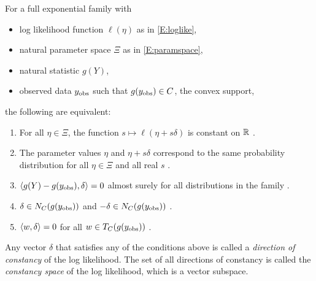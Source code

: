 \begin{theorem} \label{Thm:DOC}
For a full exponential family with
\begin{itemize}
\item log likelihood function $\ell(\eta)$ as in \eqref{E:loglike},
\item natural parameter space $\Xi$ as in \eqref{E:paramspace},
\item natural statistic $g(Y)$,
\item observed data $y_{\textrm{obs}}$ such that $g(y_{\textrm{obs}}) \in C$, the convex 
support,
\end{itemize}
the following are equivalent:
\begin{enumerate}
\item For all $\eta \in \Xi$, the function $s \mapsto \ell( \eta + s\delta)$ is 
constant on ${\mathbb R}$ \cite[Theorem 1(b)]{Geyer:gdor}.
\item The parameter values $\eta$ and  $\eta + s\delta$ correspond to the same 
probability distribution for all $\eta \in \Xi$ and all real $s$ \cite[Theorem 1(d)]
{Geyer:gdor}.
\item $\langle g(Y) - g(y_{\textrm{obs}}),\delta \rangle = 0$ almost surely for all distributions in the 
family \cite[Theorem 1(f)]{Geyer:gdor}.
\item $\delta \in N_C(g(y_{\textrm{obs}}))$ and $-\delta \in N_C(g(y_{\textrm{obs}}))$ \cite[Theorem 1(g)]
{Geyer:gdor}.
\item $\langle w,\delta \rangle = 0$ for all $w \in T_C(g(y_{\textrm{obs}}))$ \cite[Theorem 1(h)]
{Geyer:gdor}.
\end{enumerate}
\end{theorem}
Any vector $\delta$ that satisfies any of the conditions above is called a 
\emph{direction of constancy} of the log likelihood.
The set of all directions of constancy is called the \emph{constancy space} of 
the log likelihood, which is a vector subspace.

